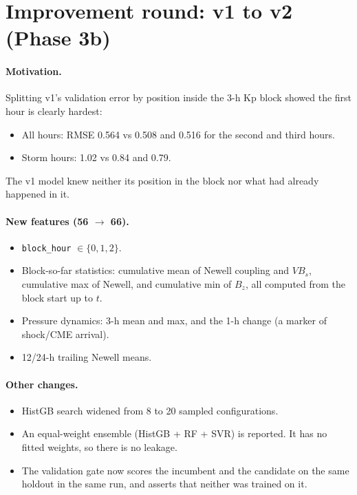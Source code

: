 \documentclass[11pt,a4paper]{article}
\newcommand{\code}[1]{\texttt{#1}}
\begin{document}
\section{Improvement round: v1 to v2 (Phase 3b)}\label{sec:v2}
\paragraph{Motivation.} Splitting v1's validation error by position inside the 3-h Kp block showed the first hour
is clearly hardest:
\begin{itemize}
\item All hours: RMSE 0.564 vs 0.508 and 0.516 for the second and third hours.
\item Storm hours: 1.02 vs 0.84 and 0.79.
\end{itemize}
The v1 model knew neither its position in the block nor what had already happened in it.

\paragraph{New features (56 $\rightarrow$ 66).}
\begin{itemize}
\item \code{block\_hour} $\in\{0,1,2\}$.
\item Block-so-far statistics: cumulative mean of Newell coupling and $VB_s$, cumulative max of Newell, and
cumulative min of $B_z$, all computed from the block start up to $t$.
\item Pressure dynamics: 3-h mean and max, and the 1-h change (a marker of shock/CME arrival).
\item 12/24-h trailing Newell means.
\end{itemize}

\paragraph{Other changes.}
\begin{itemize}
\item HistGB search widened from 8 to 20 sampled configurations.
\item An equal-weight ensemble (HistGB + RF + SVR) is reported. It has no fitted weights, so there is no leakage.
\item The validation gate now scores the incumbent and the candidate on the same holdout in the same run, and
asserts that neither was trained on it.
\end{itemize}
\end{document}
